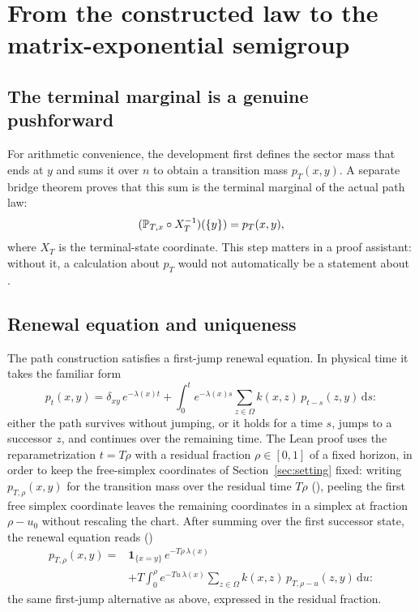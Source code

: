 \section{From the constructed law to the matrix-exponential semigroup}
\label{sec:semigroup}

\subsection{The terminal marginal is a genuine pushforward}

For arithmetic convenience, the development first defines the sector mass that ends at $y$ and sums it over $n$ to obtain a transition mass $p_T(x,y)$. A separate bridge theorem proves that this sum is the terminal marginal of the actual path law:
\begin{equation}
\label{eq:terminal-push}
  (\mathbb{P}_{T,x}\circ X_T^{-1})(\{y\})=p_T(x,y),
\end{equation}
where $X_T$ is the terminal-state coordinate. This step matters in a proof assistant: without it, a calculation about $p_T$ would not automatically be a statement about .

\subsection{Renewal equation and uniqueness}

The path construction satisfies a first-jump renewal equation. In physical time it takes the familiar form
\[
  p_t(x,y)
  = \delta_{xy}\,e^{-\lambda(x)t}
  + \int_0^{t} e^{-\lambda(x)s}
    \sum_{z\in\Omega} k(x,z)\, p_{t-s}(z,y)\,\mathrm{d}s :
\]
either the path survives without jumping, or it holds for a time $s$, jumps to a successor $z$, and continues over the remaining time. The Lean proof uses the reparametrization $t=T\rho$ with a residual fraction $\rho\in[0,1]$ of a fixed horizon, in order to keep the free-simplex coordinates of Section~\ref{sec:setting} fixed: writing $p_{T,\rho}(x,y)$ for the transition mass over the residual time $T\rho$ (), peeling the first free simplex coordinate leaves the remaining coordinates in a simplex at fraction $\rho-u_0$ without rescaling the chart. After summing over the first successor state, the renewal equation reads ()
\begin{equation}
\label{eq:renewal}
\begin{aligned}
  p_{T,\rho}(x,y)
  ={}& \mathbf{1}_{\{x=y\}}\, e^{-T\rho\,\lambda(x)}\\
  &+ T\int_0^{\rho} e^{-Tu\,\lambda(x)}
    \sum_{z\in\Omega} k(x,z)\, p_{T,\rho-u}(z,y)\,\mathrm{d}u:
\end{aligned}
\end{equation}
the same first-jump alternative as above, expressed in the residual fraction.

